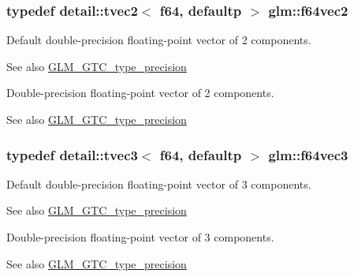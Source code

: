 \subsubsection[{\texorpdfstring{f64vec2}{f64vec2}}]{\setlength{\rightskip}{0pt plus 5cm}typedef detail\+::tvec2$<$ f64, defaultp $>$ {\bf glm\+::f64vec2}}\hypertarget{group__gtc__type__precision_ga3f131d462df8154918f93ba1ac7cc4bd}{}\label{group__gtc__type__precision_ga3f131d462df8154918f93ba1ac7cc4bd}
Default double-\/precision floating-\/point vector of 2 components. \begin{DoxySeeAlso}{See also}
\hyperlink{group__gtc__type__precision}{G\+L\+M\+\_\+\+G\+T\+C\+\_\+type\+\_\+precision}
\end{DoxySeeAlso}
Double-\/precision floating-\/point vector of 2 components. \begin{DoxySeeAlso}{See also}
\hyperlink{group__gtc__type__precision}{G\+L\+M\+\_\+\+G\+T\+C\+\_\+type\+\_\+precision} 
\end{DoxySeeAlso}
\subsubsection[{\texorpdfstring{f64vec3}{f64vec3}}]{\setlength{\rightskip}{0pt plus 5cm}typedef detail\+::tvec3$<$ f64, defaultp $>$ {\bf glm\+::f64vec3}}\hypertarget{group__gtc__type__precision_ga794ee8f0a105cda01946cd9860f492a8}{}\label{group__gtc__type__precision_ga794ee8f0a105cda01946cd9860f492a8}
Default double-\/precision floating-\/point vector of 3 components. \begin{DoxySeeAlso}{See also}
\hyperlink{group__gtc__type__precision}{G\+L\+M\+\_\+\+G\+T\+C\+\_\+type\+\_\+precision}
\end{DoxySeeAlso}
Double-\/precision floating-\/point vector of 3 components. \begin{DoxySeeAlso}{See also}
\hyperlink{group__gtc__type__precision}{G\+L\+M\+\_\+\+G\+T\+C\+\_\+type\+\_\+precision} 
\end{DoxySeeAlso}
